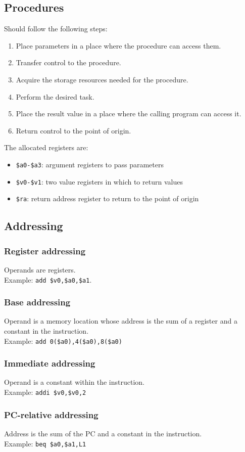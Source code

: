 \documentclass{article}
\theoremstyle{sltheorem}
\newcommand*\T[1]{\texttt{#1}}
\begin{document}
\subsection{Procedures}
Should follow the following steps:
\begin{enumerate}
	\item Place parameters in a place where the procedure can access them.
	\item Transfer control to the procedure.
	\item Acquire the storage resources needed for the procedure.
	\item Perform the desired task.
	\item Place the result value in a place where the calling program can access it.
	\item Return control to the point of origin.
\end{enumerate}
The allocated registers are:
\begin{itemize}
	\item \T{\$a0-\$a3}: argument registers to pass parameters
	\item \T{\$v0-\$v1}: two value registers in which to return values
	\item \T{\$ra}: return address register to return to the point of origin
\end{itemize}
\subsection{Addressing}
\subsubsection{Register addressing}
Operands are registers.\\ Example: \T{add \$v0,\$a0,\$a1}.
\subsubsection{Base addressing}
Operand is a memory location whose address is the sum of a register and a constant in the instruction.\\
Example: \T{add 0(\$a0),4(\$a0),8(\$a0)}
\subsubsection{Immediate addressing}
Operand is a constant within the instruction.\\
Example: \T{addi \$v0,\$v0,2}
\subsubsection{PC-relative addressing}
Address is the sum of the PC and a constant in the instruction.\\
Example: \T{beq \$a0,\$a1,L1}
\end{document}
